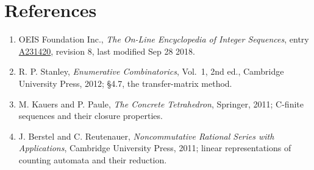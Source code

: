 \documentclass[11pt]{article}
\theoremstyle{definition}
\begin{document}
\section{References}

\begin{enumerate}

\item OEIS Foundation Inc., \emph{The On-Line Encyclopedia of Integer Sequences}, entry \href{https://oeis.org/A231420}{A231420}, revision 8, last modified Sep 28 2018.

\item R. P. Stanley, \emph{Enumerative Combinatorics}, Vol.~1, 2nd ed., Cambridge University Press, 2012; \S4.7, the transfer-matrix method.

\item M. Kauers and P. Paule, \emph{The Concrete Tetrahedron}, Springer, 2011; C-finite sequences and their closure properties.

\item J. Berstel and C. Reutenauer, \emph{Noncommutative Rational Series with Applications}, Cambridge University Press, 2011; linear representations of counting automata and their reduction.

\end{enumerate}
\end{document}
